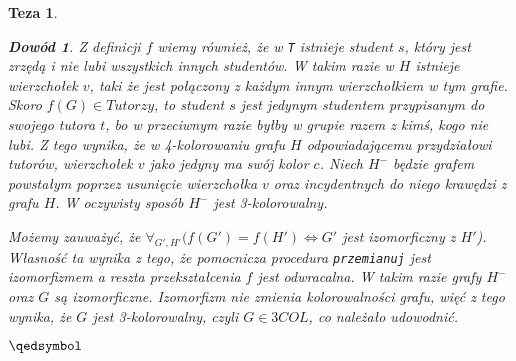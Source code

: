 \documentclass[12pt]{article}
\newtheorem*{theorem*}{Teza}
\newtheorem*{proof*}{Dowód}
\begin{document}
\begin{titlepage}
\begin{theorem*}
\begin{proof*}
Z definicji $f$ wiemy również, że w \texttt{T} istnieje student $s$, który jest \textit{zrzędą} i nie lubi wszystkich innych studentów. W takim razie w $H$ istnieje wierzchołek $v$, taki że jest połączony z każdym innym wierzchołkiem w tym grafie. Skoro $f(G) \in Tutorzy$, to student $s$ jest jedynym studentem przypisanym do swojego tutora $t$, bo w przeciwnym razie byłby w grupie razem z kimś, kogo nie lubi. Z tego wynika, że w 4-kolorowaniu grafu $H$ odpowiadającemu przydziałowi tutorów, wierzchołek $v$ jako jedyny ma swój kolor $c$. Niech $H^-$ będzie grafem powstałym poprzez usunięcie wierzchołka $v$ oraz incydentnych do niego krawędzi z grafu $H$. W oczywisty sposób $H^-$ jest 3-kolorowalny.

Możemy zauważyć, że $\forall_{G', H'}(f(G') = f(H') \Leftrightarrow G'$ jest 
izomorficzny z $H'$). Własność ta wynika z tego, że pomocnicza procedura 
\texttt{przemianuj} jest izomorfizmem a reszta przekształcenia $f$ jest odwracalna. W takim razie grafy $H^-$ oraz $G$ są izomorficzne. Izomorfizm nie zmienia kolorowalności grafu, więć z tego wynika, że $G$ jest 3-kolorowalny, czyli $G \in 3COL$, co należało udowodnić. 
\begin{flushright}
    $\qedsymbol$
\end{flushright}


    \end{proof*}
\end{theorem*}

\hrulefill

\end{titlepage}
\end{document}
